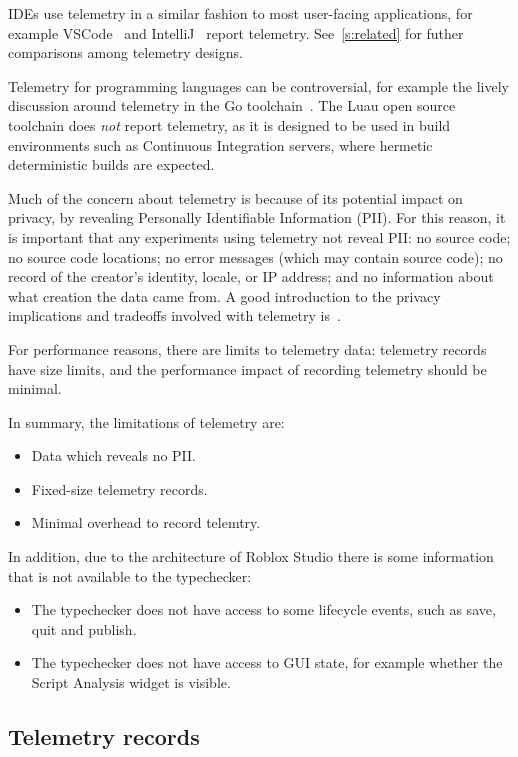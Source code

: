 \documentclass[english,submission,cleveref]{programming}
\begin{document}
IDEs use telemetry in a similar fashion to most user-facing
applications, for example VSCode~\cite{vsc-telemetry} and
IntelliJ~\cite{intellij-telemetry} report telemetry.
See~\cref{s:related} for futher comparisons among telemetry designs.

Telemetry for programming languages can be controversial, for example
the lively discussion around telemetry in the Go
toolchain~\cite{golang-telemetry}. 
The Luau open source toolchain does \emph{not} report telemetry,
as it is designed to be used in build environments such as Continuous Integration
servers, where hermetic deterministic builds are expected.

Much of the concern about telemetry is because of its potential impact on
privacy, by revealing Personally Identifiable Information (PII).
For this reason, it is important that any experiments using telemetry
not reveal PII:
no source code;
no source code locations;
no error messages (which may contain source code);
no record of the creator's identity, locale, or IP address;
and no information about what creation the data came from.
A good introduction to the privacy implications and tradeoffs
involved with telemetry is~\cite{transparent-telemetry}.

For performance reasons, there are limits to telemetry data:
telemetry records have size limits, and the performance impact of
recording telemetry should be minimal.

In summary, the limitations of telemetry are:
\begin{itemize}
  \item Data which reveals no PII.
  \item Fixed-size telemetry records.
  \item Minimal overhead to record telemtry.
\end{itemize}
In addition, due to the architecture of Roblox Studio
there is some information that is not available to the
typechecker:
\begin{itemize}
  \item The typechecker does not have access to some lifecycle events,
    such as save, quit and publish.
  \item The typechecker does not have access to GUI state, for example
    whether the Script Analysis widget is visible.
\end{itemize}

\subsection{Telemetry records}
\label{s:telemetry-records}
\end{document}
